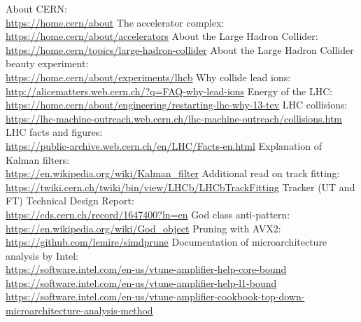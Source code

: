 \documentclass[12pt]{article}
\begin{document}
\begin{thebibliography}{asd}
	 About CERN: \\
		\url{https://home.cern/about}
	 The accelerator complex: \\
		\url{https://home.cern/about/accelerators}
	 About the Large Hadron Collider: \\
		\url{https://home.cern/topics/large-hadron-collider}
	 About the Large Hadron Collider beauty experiment: \\
		\url{https://home.cern/about/experiments/lhcb}
	 Why collide lead ions: \\
		\url{http://alicematters.web.cern.ch/?q=FAQ-why-lead-ions}
	 Energy of the LHC: \\
		\url{https://home.cern/about/engineering/restarting-lhc-why-13-tev}
	 LHC collisions: \\
		\url{https://lhc-machine-outreach.web.cern.ch/lhc-machine-outreach/collisions.htm}
	 LHC facts and figures: \\
		\url{https://public-archive.web.cern.ch/en/LHC/Facts-en.html}
	 Explanation of Kalman filters: \\
		\url{https://en.wikipedia.org/wiki/Kalman_filter}
	 Additional read on track fitting: \\
		\url{https://twiki.cern.ch/twiki/bin/view/LHCb/LHCbTrackFitting}
	 Tracker (UT and FT) Technical Design Report: \\
		\url{https://cds.cern.ch/record/1647400?ln=en}
	 God class anti-pattern: \\
		\url{https://en.wikipedia.org/wiki/God_object}
	 Pruning with AVX2: \\
		\url{https://github.com/lemire/simdprune} 
	 Documentation of microarchitecture analysis by Intel: \\
		\url{https://software.intel.com/en-us/vtune-amplifier-help-core-bound}\\
		\url{https://software.intel.com/en-us/vtune-amplifier-help-l1-bound}\\
		\url{https://software.intel.com/en-us/vtune-amplifier-cookbook-top-down-microarchitecture-analysis-method}
\end{thebibliography}
\end{document}
